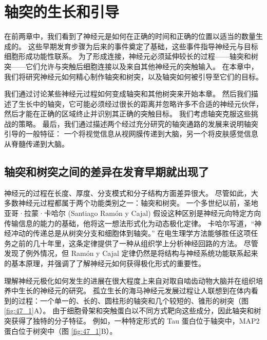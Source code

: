 \chapter{轴突的生长和引导} \label{chap:chap47}


在前两章中，我们看到了神经元是如何在正确的时间和正确的位置以适当的数量生成的。
这些早期发育步骤为后来的事件奠定了基础，这些事件指导神经元与目标细胞形成功能性联系。
为了形成连接，神经元必须延伸较长的过程——轴突和树突——它们允许与突触后细胞连接以及来自其他神经元的突触输入。
在本章中，我们将研究神经元如何精心制作轴突和树突，以及轴突如何被引导至它们的目标。


我们通过讨论某些神经元过程如何变成轴突和其他树突来开始本章。
然后我们描述了生长中的轴突，它可能必须经过很长的距离并忽略许多不合适的神经元伙伴，然后才能在正确的区域终止并识别其正确的突触目标。
我们考虑轴突克服这些挑战的策略。
最后，我们通过描述两个经过充分研究的轴突通路的发展来说明轴突引导的一般特征：
一个将视觉信息从视网膜传递到大脑，另一个将皮肤感觉信息从脊髓传递到大脑。



\section{轴突和树突之间的差异在发育早期就出现了}

神经元的过程在长度、厚度、分支模式和分子结构方面差异很大。
尽管如此，大多数神经元过程都属于两个功能类别之一：轴突和树突。
一个多世纪以前，圣地亚哥·拉蒙·卡哈尔 (Santiago Ramón y Cajal) 假设这种区别是神经元向特定方向传输信息的能力的基础，他将这一想法形式化为动态极化定律。
卡哈尔写道，“神经冲动的传递总是从树突分支和细胞体到轴突。” 在电生理学方法能够胜任这项任务之前的几十年里，这条定律提供了一种从组织学上分析神经回路的方法。
尽管发现了例外情况，但 Ramón y Cajal 定律仍然是将结构与神经系统功能联系起来的基本原理，并强调了了解神经元如何获得极化形式的重要性。


理解神经元极化如何发生的进展在很大程度上来自对取自啮齿动物大脑并在组织培养中生长的神经元的研究。
孤立生长的海马神经元发展过程让人联想到在体内看到的过程：一个单一的、长的、圆柱形的轴突和几个较短的、锥形的树突（图 \ref{fig:47_1}A）。
由于细胞骨架和突触蛋白以不同方式靶向这些成分，因此轴突和树突获得了独特的分子特征。
例如，一种特定形式的 Tau 蛋白位于轴突中，MAP2 蛋白位于树突中（图 \ref{fig:47_1}B）。


